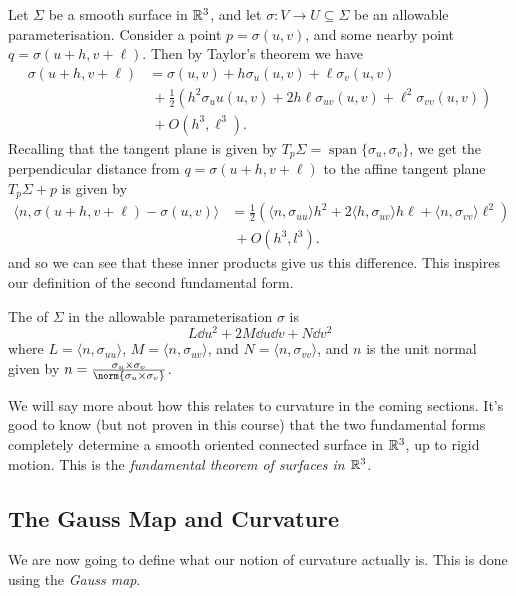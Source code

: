 \documentclass[a4paper]{article}
\begin{document}
Let $\Sigma$ be a smooth surface in $\mathbb{R}^3$, and let $\sigma: V \rightarrow U \subseteq \Sigma$ be an allowable parameterisation. Consider a point $p = \sigma(u, v)$, and some nearby point $q = \sigma(u + h, v + \ell)$. Then by Taylor's theorem we have
\begin{align*}
\sigma(u + h, v + \ell) &= \sigma(u, v) + h \sigma_u(u, v) + \ell \sigma_v(u, v) \\
&\ + \frac{1}{2}\left(h^2 \sigma_uu(u, v) + 2 h\ell \sigma_{uv}(u, v) + \ell^2 \sigma_{vv}(u, v)\right)\\&\ + O(h^3, \ell^3).
\end{align*}
Recalling that the tangent plane is given by $T_p\Sigma = \operatorname{span}\{\sigma_u, \sigma_v\}$, we get the perpendicular distance from $q = \sigma(u + h, v+\ell)$ to the affine tangent plane $T_p\Sigma + p$ is given by
\begin{align*}
    \langle n, \sigma(u + h, v + \ell) - \sigma(u, v)\rangle &= \frac{1}{2}\left(\langle n, \sigma_{uu} \rangle h^2 + 2 \langle h, \sigma_{uv}\rangle h \ell + \langle n, \sigma_{vv} \rangle \ell^2\right)\\&\  + O(h^3, l^3). 
\end{align*}
and so we can see that these inner products give us this difference. This inspires our definition of the second fundamental form.

\begin{definition}
    The  of $\Sigma$ in the allowable parameterisation $\sigma$ is
    $$
    L \dd u^2 + 2M \dd u \dd v + N \dd v^2
    $$
    where $L = \langle n, \sigma_{uu} \rangle$, $M =  \langle n, \sigma_{uv} \rangle$, and $N = \langle n, \sigma_{vv} \rangle$, and $n$ is the unit normal given by $n = \frac{\sigma_u \times \sigma_v}{\norm{\sigma_u \times \sigma_v}}$.
\end{definition}

We will say more about how this relates to curvature in the coming sections. It's good to know (but not proven in this course) that the two fundamental forms completely determine a smooth oriented connected surface in $\mathbb{R}^3$, up to rigid motion. This is the \emph{fundamental theorem of surfaces in $\mathbb{R}^3$}.

\subsection{The Gauss Map and Curvature}

We are now going to define what our notion of curvature actually is. This is done using the \emph{Gauss map}.
\end{document}
